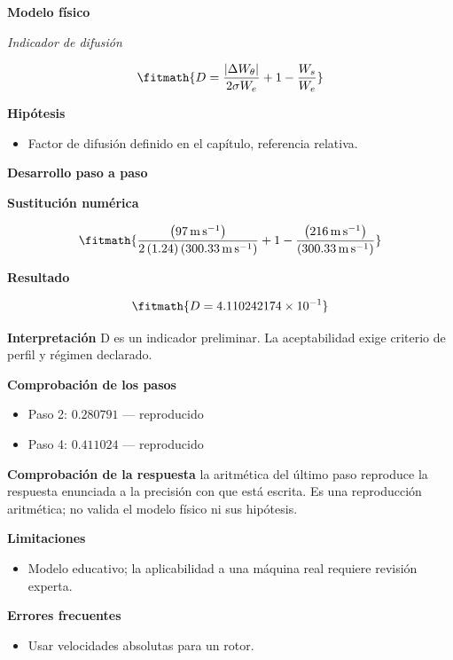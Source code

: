 \documentclass[10pt,openany]{book}
\begin{document}
\noindent\textbf{Modelo físico}

\noindent\textit{Indicador de difusión}

\[
\fitmath{D=\frac{|\Delta W_\theta|}{2 \sigma W_e} + 1 - \frac{W_s}{W_e}}
\]

\noindent\textbf{Hipótesis}
\begin{itemize}
\item Factor de difusión definido en el capítulo, referencia relativa.
\end{itemize}

\noindent\textbf{Desarrollo paso a paso}



\noindent\textbf{Sustitución numérica}

\[
\fitmath{\frac{\left(97\,\mathrm{m}\,\mathrm{s}^{-1}\right)}{2 \left(1.24\right) \left(300.33\,\mathrm{m}\,\mathrm{s}^{-1}\right)} + 1 - \frac{\left(216\,\mathrm{m}\,\mathrm{s}^{-1}\right)}{\left(300.33\,\mathrm{m}\,\mathrm{s}^{-1}\right)}}
\]

\noindent\textbf{Resultado}

\[
\fitmath{D=4.110242174\times10^{-1}}
\]

\noindent\textbf{Interpretación}
D es un indicador preliminar. La aceptabilidad exige criterio de perfil y régimen declarado.

\noindent\textbf{Comprobación de los pasos}
\begin{itemize}
\item Paso 2: $0.280791$ — reproducido
\item Paso 4: $0.411024$ — reproducido
\end{itemize}

\noindent\textbf{Comprobación de la respuesta} la aritmética del último paso reproduce la respuesta enunciada a la precisión con que está escrita. Es una reproducción aritmética; no valida el modelo físico ni sus hipótesis.

\noindent\textbf{Limitaciones}
\begin{itemize}
\item Modelo educativo; la aplicabilidad a una máquina real requiere revisión experta.
\end{itemize}

\noindent\textbf{Errores frecuentes}
\begin{itemize}
\item Usar velocidades absolutas para un rotor.
\end{itemize}
\end{document}
